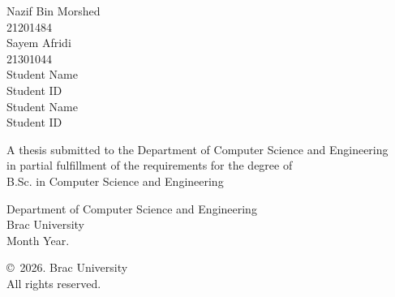 \begin{titlepage}
\renewcommand*{\thepage}{Title} %

    \begin{center}
        \vspace*{3cm} %

        {\fontsize{17.28pt}{22pt}\selectfont{Hybrid CNN--Transformer Networks with Clinical Metadata for Skin Lesion Classification}
        }

        \vspace{1.5cm}


        \vspace{0.5cm}

        	Nazif Bin Morshed\\
	        21201484\\
	        Sayem Afridi\\
	        21301044\\
	        Student Name\\
	        Student ID\\
	        Student Name\\
	        Student ID

        \vspace{1.5cm}

        	A thesis submitted to the Department of Computer Science and Engineering\\
            in partial fulfillment of the requirements for the degree of\\
            B.Sc. in Computer Science and Engineering

        \vspace{2.5cm}

    		Department of Computer Science and Engineering\\
            Brac University\\
            Month Year.

        \vspace{3cm}

    		\copyright\ 2026. Brac University\\
            All rights reserved.

    \end{center}

\end{titlepage}
